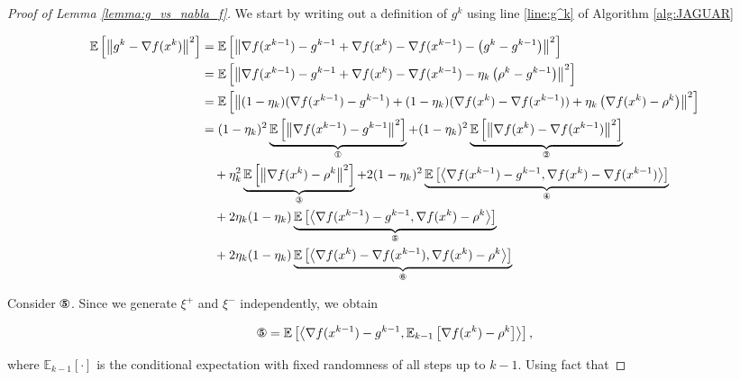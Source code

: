     \begin{proof}[Proof of Lemma \ref{lemma:g_vs_nabla_f}]
        We start by writing out a definition of $g^k$ using line \ref{line:g^k} of Algorithm \ref{alg:JAGUAR}

        \begin{equation*}
        \begin{split}
            \expect{\norms{g^k - \nabla f(x^k)}^2}
            &=
            \expect{\norms{\nabla f(x^{k-1}) - g^{k-1} + \nabla f(x^k) - \nabla f(x^{k-1}) - \left( g^k - g^{k-1} \right)}^2}
            \\&=
            \expect{\norms{\nabla f(x^{k-1}) - g^{k-1} + \nabla f(x^k) - \nabla f(x^{k-1}) - \eta_k\left( \rho^k - g^{k-1} \right)}^2}
            \\&=
            \expect{\norms{(1-\eta_k)(\nabla f(x^{k-1}) - g^{k-1}) 
            + (1 - \eta_k) (\nabla f(x^k) - \nabla f(x^{k-1})) + \eta_k \left( \nabla f(x^k) - \rho^k \right)}^2}
            \\&=
            (1-\eta_k)^2 \underbrace{\expect{\norms{\nabla f(x^{k-1}) - g^{k-1}}^2}}_{\circledOne} 
            + 
            (1-\eta_k)^2 \underbrace{\expect{\norms{\nabla f(x^k) - \nabla f(x^{k-1})}^2}}_{\circledTwo} 
            \\&\quad+
            \eta_k^2 \underbrace{\expect{\norms{\nabla f(x^k) - \rho^k}^2}}_{\circledThree} 
            +
            2(1 - \eta_k)^2\underbrace{\expect{\dotprod{\nabla f(x^{k-1}) - g^{k-1}}{\nabla f(x^k) - \nabla f(x^{k-1})}}}_{\circledFour}
            \\&\quad+
            2 \eta_k(1 - \eta_k)\underbrace{\expect{\dotprod{\nabla f(x^{k-1}) - g^{k-1}}{\nabla f(x^k) - \rho^k}}}_{\circledFive}
            \\&\quad+
            2 \eta_k(1 - \eta_k)\underbrace{\expect{\dotprod{\nabla f(x^k) - \nabla f(x^{k-1})}{\nabla f(x^k) - \rho^k}}}_{\circledSix}
        \end{split}
        \end{equation*}

        Consider $\circledFive$. Since we generate $\xi^+$ and $\xi^-$ independently, we obtain 

        \begin{equation*}
            \circledFive = \expect{\dotprod{\nabla f(x^{k-1}) - g^{k-1}}{\mathbb{E}_{k - 1} \left[\nabla f(x^k) - \rho^k \right]}},
        \end{equation*}

        where $\mathbb{E}_{k-1}[\cdot]$ is the conditional expectation with fixed randomness of all steps up to $k-1$. Using fact that 


\end{proof}
